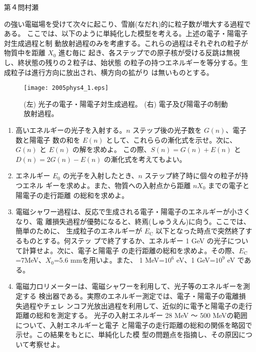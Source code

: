 \begin{question}{第４問}{村瀬}
\begin{enumerate}
  の強い電磁場を受けて次々に起こり、雪崩(なだれ)的に粒子数が増大する過程である。
  ここでは、以下のように単純化した模型を考える。上述の電子・陽電子対生成過程と制
  動放射過程のみを考慮する。これらの過程はそれぞれの粒子が物質中を距離 $X_0$ 進む毎に
  起き、各ステップでの原子核が受ける反跳は無視し、終状態の残りの２粒子は、始状態
  の粒子の持つエネルギーを等分する。生成粒子は進行方向に放出され、横方向の拡がり
  は無いものとする。
  \begin{figure}[b]
    \begin{center}
    \texttt{[image: 2005phys4\_1.eps]}
    \end{center}
    \caption{(左) 光子の電子・陽電子対生成過程。 (右) 電子及び陽電子の制動放射過程。}
  \end{figure}
  \begin{enumerate}
  \item
  高いエネルギーの光子を入射する。$n$ ステップ後の光子数を $G(n)$、電子数と陽電子
  数の和を $E(n)$ として、これららの漸化式を示せ。次に、$G(n)$ と $E(n)$ の解を求めよ。
  この際、$S(n)=G(n)+E(n)$ と $D(n)=2G(n)-E(n)$ の漸化式を考えてもよい。
  \item
  エネルギー $E_0$ の光子を入射したとき、$n$ ステップ終了時に個々の粒子が持つエネル
  ギーを求めよ。また、物質への入射点から距離 $nX_0$ までの電子と陽電子の走行距離
  の総和を求めよ。
  \item
  電磁シャワー過程は、反応で生成される電子・陽電子のエネルギーが小さくなり、電
  離損失過程が優勢になると、終焉(しゅうえん)に向う。ここでは、簡単のために、
  生成粒子のエネルギーが $E_\mathrm{C}$ 以下となった時点で突然終了するものとする。何ステッ
  プで終了するか、エネルギー 1 GeV の光子について計算せよ。次に、電子と陽電子
  の走行距離の総和を求めよ。その際、$E_\mathrm{C}$=7MeV、$X_0$=5.6 mmを用いよ。また、
  1 MeV=$10^6$ eV、1 GeV=$10^9$ eV である。
  \item
  電磁力ロリメーターは、電磁シャワーを利用して、光子等のエネルギーを測定する
  検出器である。実際のエネルギー測定では、電子・陽電子の電離損失過程やチェレ
  ンコフ光放出過程を利用して、近似的に電予と陽電子の走行距離の総和を測定する。
  光子の入射エネルギー 28 MeV 〜 500 MeVの範囲について、入射エネルギーと電子
  と陽電子の走行距離の総和の関係を略図で示せ。この結果をもとに、単純化した模
  型の問題点を指摘し、その原因について考察せよ。
  \end{enumerate}
\end{enumerate}
\end{question}
